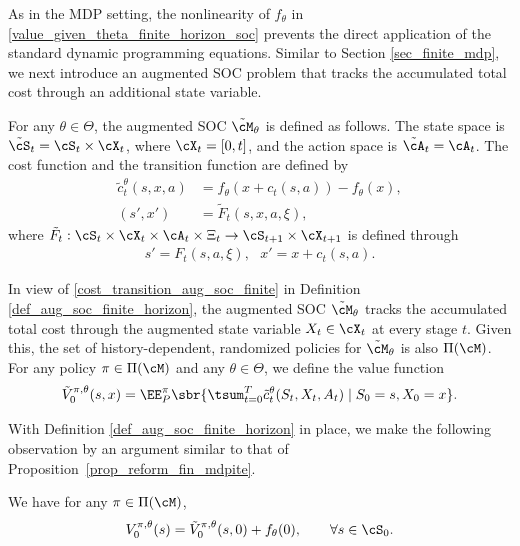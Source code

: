 \documentclass[9pt]{article}
\numberwithin{equation}{section}
\begin{document}
As in the MDP setting, the nonlinearity of $f_\theta$ in \eqref{value_given_theta_finite_horizon_soc} prevents the direct application of the standard dynamic programming equations. 
Similar to Section \ref{sec_finite_mdp}, we next introduce an augmented SOC problem that tracks the accumulated total cost through an additional state variable.

\begin{definition}\label{def_aug_soc_finite_horizon}
    For any $\theta \in \Theta$, the augmented SOC $\tilde{\cM}_\theta$ is defined as follows. 
    The state space is $\tilde{\cS}_t = \cS_t \times \cX_t$, where $\cX_t = [0,t]$, and the action space is $\tilde{\cA}_t = \cA_t$.
    The cost function and the transition function are defined by
\begin{align}\label{cost_transition_aug_soc_finite}
\tilde{c}_t^\theta(s,x,a)
&= f_\theta({x+c_t(s,a)})-f_\theta(x), \nonumber \\
(s',x') &= \tilde{F}_t(s,x,a,\xi),
\end{align}
where $\tilde{F}_t: \cS_t \times \cX_t \times \cA_t \times \Xi_t \to \cS_{t+1} \times \cX_{t+1}$ is defined through
\begin{align*}
    s' = F_t(s,a,\xi), 
    ~~~
    x' = x+c_t(s,a).
\end{align*}
\end{definition}

In view of \eqref{cost_transition_aug_soc_finite} in Definition \ref{def_aug_soc_finite_horizon}, the augmented SOC $\tilde{\cM}_\theta$ tracks the accumulated total cost through the augmented state variable $X_t \in \cX_t$ at every stage $t$.
Given this, the set of history-dependent, randomized policies for $\tilde{\cM}_\theta$ is also $\Pi(\cM)$.
For any policy $\pi \in \Pi(\cM)$ and any $\theta \in \Theta$, we define the value function
\begin{align}\label{eq_value_given_pi_aug_soc}
    \tilde{V}^{\pi,\theta}_0(s,x)
    =
    \EE^\pi_P \sbr{
    \tsum_{t=0}^T \tilde{c}_t^\theta(S_t,X_t,A_t)
    \mid S_0=s, X_0=x
    }.
\end{align}

With Definition \ref{def_aug_soc_finite_horizon} in place, we make the following observation by an argument similar to that of Proposition~\ref{prop_reform_fin_mdpite}.

\begin{proposition}\label{prop_reform_finite_soc}
    We have for any $\pi \in \Pi(\cM)$,
    \begin{align*}
        V_0^{\pi,\theta}(s)
        =
        \tilde{V}^{\pi,\theta}_0(s,0) + f_\theta(0),
        \qquad \forall s \in \cS_0.
    \end{align*}
\end{proposition}
\end{document}

